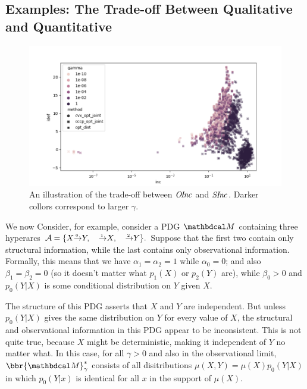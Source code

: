 \subsection{Examples: The Trade-off Between Qualitative and Quantitative}
\label{sec:example-gamma}

\begin{figure}
    \includegraphics[width=\linewidth]{figs/inc-idef2}
    \caption{An illustration of the trade-off between $\mathit{O\mskip-2.5muI\mskip-3.5mun\mskip-1.7muc}$ and $\mathit{S\mskip-2.5muI\mskip-3.5mun\mskip-1.7muc}_{}$. Darker collors correspond to larger $\gamma$.}\label{fig:inc-idef}
\end{figure}

We now 
Consider, for example, consider a PDG $\dg M$ containing three hyperarcs
$
    \Ar = \{ \ed0XY, \quad \ed{1}{}{X}, \quad \ed2{}Y  \}.
$
Suppose that the first two contain only structural information, 
while the last contains only observational information. 
Formally, this means that we have $\alpha_1 = \alpha_2 = 1$ while $\alpha_0 = 0$;
and also $\beta_1 = \beta_2 = 0$ (so it doesn't matter what $p_1(X)$ or $p_2(Y)$ are), while $\beta_0 > 0$ and $p_0(Y|X)$ is some conditional distribution on $Y$ given $X$. 

The structure of this PDG asserts that $X$ and $Y$ are independent.
But unless $p_0(Y|X)$ gives the same distribution on $Y$ for every value of $X$, the structural and observational information in this PDG appear to be inconsistent.
This is not quite true, because $X$ might be deterministic, making it independent of $Y$ no matter what. 
In this case, for all $\gamma > 0$ and also in the observational limit, 
$\bbr{\dg M}^*_\gamma$ consists of all disitributions $\mu(X,Y) = \mu(X)p_0(Y|X)$ in which
$p_0(Y|x)$ is identical for all $x$ in the support of $\mu(X)$.

